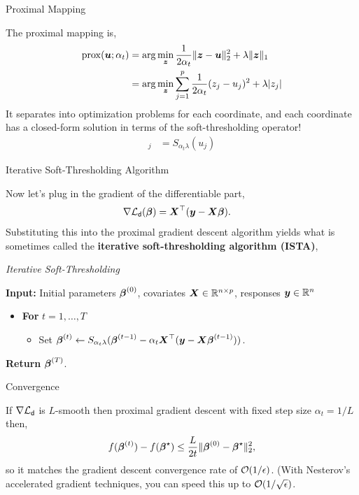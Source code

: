 \documentclass[aspectratio=169]{beamer}
\begin{document}
\begin{frame}[t,allowframebreaks]{Proximal Mapping}\label{proximal-mapping}

The proximal mapping is, \begin{align*}
\mathrm{prox}(\boldsymbol{u}; \alpha_t) 
&= \arg \min_{\boldsymbol{z}} \frac{1}{2 \alpha_t} \| \boldsymbol{z} - \boldsymbol{u} \|_2^2 + \lambda \|\boldsymbol{z}\|_1 \\
&= \arg \min_{\boldsymbol{z}} \sum_{j=1}^p  \frac{1}{2 \alpha_t} (z_j - u_j)^2 + \lambda |z_j| 
\end{align*} It separates into optimization problems for each
coordinate, and each coordinate has a closed-form solution in terms of
the soft-thresholding operator! \begin{align*}
[\mathrm{prox}(\mbu; \alpha_t)]_j 
&= S_{\alpha_t \lambda}(u_j)
\end{align*}
\end{frame}

\begin{frame}[t,allowframebreaks]{Iterative Soft-Thresholding
Algorithm}\label{iterative-soft-thresholding-algorithm}

Now let's plug in the gradient of the differentiable part,
\begin{align*}
\nabla \mathcal{L}_{\mathsf{d}}(\boldsymbol{\beta}) &= \boldsymbol{X}^\top (\boldsymbol{y} - \boldsymbol{X} \boldsymbol{\beta}).
\end{align*} Substituting this into the proximal gradient descent
algorithm yields what is sometimes called the \textbf{iterative
soft-thresholding algorithm (ISTA)},

\textit{Iterative Soft-Thresholding}

\textbf{Input:} Initial parameters \(\boldsymbol{\beta}^{(0)}\), covariates
\(\boldsymbol{X} \in \mathbb{R}^{n \times p}\), responses \(\boldsymbol{y} \in \mathbb{R}^n\)

\begin{itemize}
\item
  \textbf{For} \(t=1,\ldots, T\)

  \begin{itemize}
  \item Set
    \(\boldsymbol{\beta}^{(t)} \leftarrow S_{\alpha_t \lambda}(\boldsymbol{\beta}^{(t-1)} - \alpha_t \boldsymbol{X}^\top (\boldsymbol{y} - \boldsymbol{X} \boldsymbol{\beta}^{(t-1)}))\).
  \end{itemize}
\end{itemize}

\textbf{Return} \(\boldsymbol{\beta}^{(T)}\). 
\end{frame}

\begin{frame}[t,allowframebreaks]{Convergence}\label{convergence}

If \(\nabla \mathcal{L}_{\mathsf{d}}\) is \(L\)-smooth then proximal gradient
descent with fixed step size \(\alpha_t = 1/L\) then, \begin{align*}
f(\boldsymbol{\beta}^{(t)}) - f(\boldsymbol{\beta}^\star) \leq \frac{L}{2 t} \|\boldsymbol{\beta}^{(0)} - \boldsymbol{\beta}^\star \|_2^2,
\end{align*} so it matches the gradient descent convergence rate of
\(\mathcal{O}(1/\epsilon)\). (With Nesterov's accelerated gradient techniques,
you can speed this up to \(\mathcal{O}(1/\sqrt{\epsilon})\).
\end{frame}
\end{document}
